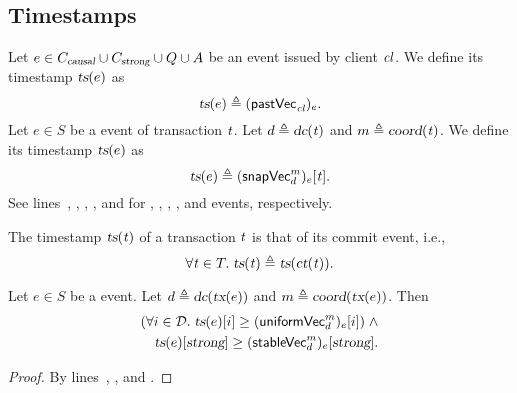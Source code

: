 
\subsection{Timestamps} \label{ss:ts}

\begin{appdefinition} \label{def:ts-op}
  Let $e \in C_{\textsl{causal}} \cup C_{\textsl{strong}} \cup Q \cup A$
  be an event issued by client $\mathit{cl}$.
  We define its timestamp $\textsl{ts}(e)$ as
  \[
    \textsl{ts}(e) \triangleq ({\sf pastVec}_{\mathit{cl}})_{e}.
  \]
  Let $e \in S$ be a \start{} event of transaction $\mathit{t}$.
  Let $d \triangleq \textsl{dc}(\mathit{t})$ and $m \triangleq \textsl{coord}(\mathit{t})$.
  We define its timestamp $\textsl{ts}(e)$ as
  \[
    \textsl{ts}(e) \triangleq ({\sf snapVec}^{m}_{d})_{e}[\mathit{t}].
  \]
  See lines~\code{\ref{alg:unistore-client}}{\ref{line:starttx-ts}},
  \code{\ref{alg:unistore-client}}{\ref{line:commitcausaltx-ts}},
  \code{\ref{alg:unistore-client}}{\ref{line:commitstrongtx-ts}},
  \code{\ref{alg:unistore-client}}{\ref{line:fence-ts}},
  and \code{\ref{alg:unistore-client}}{\ref{line:clattach-ts}}
  for \start, \commitcausaltx, \commitstrongtx, \fence,
  and \clattach{} events, respectively.
\end{appdefinition}

\begin{appdefinition} \label{def:ts-tx}
  The timestamp $\textsl{ts}(\mathit{t})$ of a transaction $\mathit{t}$
  is that of its commit event, i.e.,
  \[
    \forall \mathit{t} \in T.\;
      \textsl{ts}(\mathit{t}) \triangleq \textsl{ts}(\textsl{ct}(\mathit{t})).
  \]
\end{appdefinition}

\begin{applemma} \label{lemma:ts-start}
  Let $e \in S$ be a \start{} event.
  Let $d \triangleq \textsl{dc}(\textsl{tx}(e))$ and $m \triangleq \textsl{coord}(\textsl{tx}(e))$.
  Then
  \begin{align*}
    (\forall i \in \mathcal{D}.\; \textsl{ts}(e)[i] \ge ({\sf uniformVec}^{m}_{d})_{e}[i])
    \;\land \\
    \textsl{ts}(e)[\textsl{strong}] \ge ({\sf stableVec}^{m}_{d})_{e}[\textsl{strong}].
  \end{align*}
\end{applemma}

\begin{proof} \label{proof:ts-start}
  By lines~\code{\ref{alg:unistore-coord}}{\ref{line:start-snapvc}},
  \code{\ref{alg:unistore-coord}}{\ref{line:start-snapvc-d}},
  and \code{\ref{alg:unistore-coord}}{\ref{line:start-snapvc-strong}}.
\end{proof}

